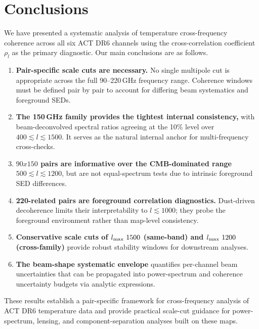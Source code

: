 \documentclass[twocolumn,showpacs,preprintnumbers,amsmath,amssymb,floatfix,prd]{revtex4-2}
\def\ell{l}%
\def\sim{~}%
\def\times{x}%
\begin{document}
\section{Conclusions}\label{sec:conclusions}

We have presented a systematic analysis of temperature cross-frequency
coherence across all six ACT DR6 channels using the cross-correlation
coefficient $\rho_\ell$ as the primary diagnostic.  Our main conclusions
are as follows.

\begin{enumerate}
\item \textbf{Pair-specific scale cuts are necessary.}
  No single multipole cut is appropriate across the full 90--220\,GHz
  frequency range.  Coherence windows must be defined pair by pair to
  account for differing beam systematics and foreground SEDs.

\item \textbf{The 150\,GHz family provides the tightest internal
  consistency,} with beam-deconvolved spectral ratios agreeing at the
  10\% level over $400\lesssim\ell\lesssim1500$.  It serves as the
  natural internal anchor for multi-frequency cross-checks.

\item \textbf{$90\times150$ pairs are informative over the CMB-dominated
  range} $500\lesssim\ell\lesssim1200$, but are not equal-spectrum tests
  due to intrinsic foreground SED differences.

\item \textbf{220-related pairs are foreground correlation diagnostics.}
  Dust-driven decoherence limits their interpretability to
  $\ell\lesssim1000$; they probe the foreground environment rather than
  map-level consistency.

\item \textbf{Conservative scale cuts of $\ell_{\rm max}\sim1500$
  (same-band) and $\ell_{\rm max}\sim1200$ (cross-family)} provide
  robust stability windows for downstream analyses.

\item \textbf{The beam-shape systematic envelope} quantifies per-channel
  beam uncertainties that can be propagated into power-spectrum and
  coherence uncertainty budgets via analytic expressions.
\end{enumerate}

These results establish a pair-specific framework for cross-frequency
analysis of ACT DR6 temperature data and provide practical scale-cut
guidance for power-spectrum, lensing, and component-separation analyses
built on these maps.
\end{document}
